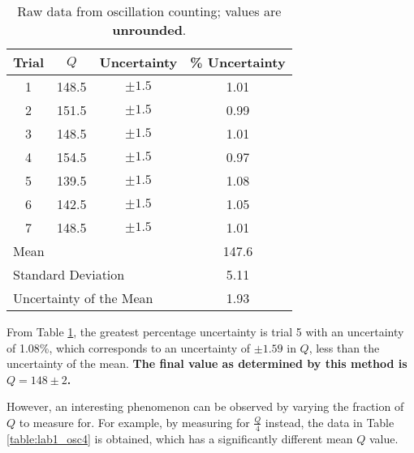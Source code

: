 \documentclass[aps,twocolumn,secnumarabic,nobalancelastpage,amsmath,amssymb,nofootinbib,floatfix,letterpaper]{revtex4}
\begin{document}
\begin{table}[h]
    \begin{tabular}{c|c|c|c}
        Trial & \(Q\) & Uncertainty & \% Uncertainty \\
        \hline
        1   & 148.5 & \(\pm 1.5\) & 1.01 \\
        2   & 151.5 & \(\pm 1.5\) & 0.99 \\
        3	& 148.5 & \(\pm 1.5\) & 1.01 \\
        4	& 154.5 & \(\pm 1.5\) & 0.97 \\
        5	& 139.5 & \(\pm 1.5\) & 1.08 \\
        6	& 142.5 & \(\pm 1.5\) & 1.05 \\
        7	& 148.5 & \(\pm 1.5\) & 1.01 \\
        \hline
        \multicolumn{3}{l}{Mean} & 147.6 \\
        \multicolumn{3}{l}{Standard Deviation} & 5.11 \\
        \multicolumn{3}{l}{Uncertainty of the Mean} & 1.93
    \end{tabular}
    \caption{Raw data from oscillation counting; values are \textbf{unrounded}.}
    \label{table:lab1_osc}
\end{table}

From Table \ref{table:lab1_osc}, the greatest percentage uncertainty is trial 5 with an uncertainty of 1.08\%, which
corresponds to an uncertainty of \(\pm 1.59\) in \(Q\), less than the uncertainty of the mean. \textbf{The final value
as determined by this method is \(Q = 148 \pm 2\).}

However, an interesting phenomenon can be observed by varying the fraction of \(Q\) to measure for.
For example, by measuring for \(\frac{Q}{4}\) instead, the data in Table \ref{table:lab1_osc4} is obtained, which has a
significantly different mean \(Q\) value.
\end{document}

